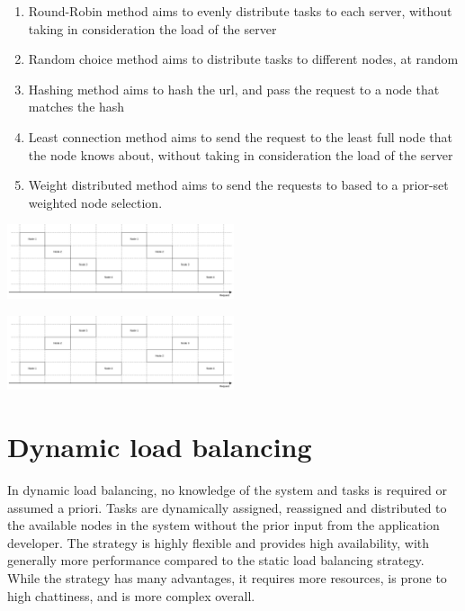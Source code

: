 \documentclass[conference]{IEEEtran}
\begin{document}
    \begin{enumerate}
        \item Round-Robin method aims to evenly distribute tasks to each server,
        without taking in consideration the load of the server
        \item Random choice method aims to distribute tasks to different nodes, at random
        \item Hashing method aims to hash the url, and pass the request to a node that matches the hash
        \item Least connection method aims to send the request to the least full node that the node knows about,
        without taking in consideration the load of the server
        \item Weight distributed method aims to send the requests to based to a prior-set weighted node selection. 
    \end{enumerate}

    \begin{center}
        \vspace{1em}
        \includegraphics[width=0.5\textwidth]{round-robin-method.png}
         \label{round-robin-strategy}
        \vspace{1em}
    \end{center}

    \begin{center}
        \vspace{1em}
        \includegraphics[width=0.5\textwidth]{random-method.png}
         \label{random-strategy}
        \vspace{1em}
    \end{center}

\section{Dynamic load balancing}
    In dynamic load balancing, no knowledge of the system and tasks is required or assumed a priori. Tasks are dynamically
assigned, reassigned and distributed to the available nodes in the system without the prior input from the application developer.
The strategy is highly flexible and provides high availability, with generally more performance compared to the static load
balancing strategy. While the strategy has many advantages, it requires more resources, is prone to high chattiness, and
is more complex overall. 
\end{document}
